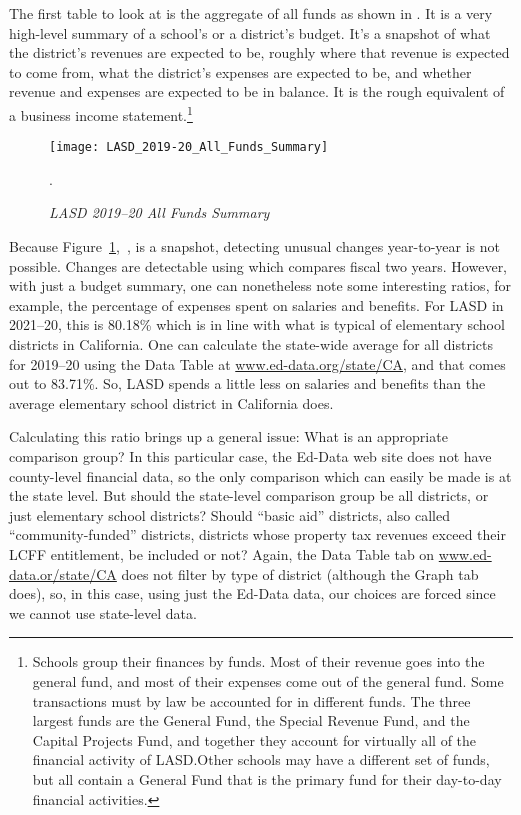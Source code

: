 The first table to look at is the aggregate of all funds as shown in . It is a very high-level summary of a school's or a district's budget. It's a snapshot of what the district's revenues are expected to be, roughly where that revenue is expected to come from, what the district's expenses are expected to be, and whether revenue and expenses are expected to be in balance. It is the rough equivalent of a business income statement.\footnote{Schools group their finances by funds. Most of their revenue goes into the general fund, and most of their expenses come out of the general fund. Some transactions must by law be accounted for in different funds. The three largest funds are the General Fund, the Special Revenue Fund, and the Capital Projects Fund, and together they account for virtually all of the financial activity of LASD.\@ Other schools may have a different set of funds, but all contain a General Fund that is the primary fund for their day-to-day financial activities.}

\begin{figure}
  \centering
  \caption[LASD 2019–20 All Funds Summary]{\textit{LASD 2019–20 All Funds Summary}}\label{fig:LASD_All_Funds_Summary}
  \texttt{[image: LASD\_2019-20\_All\_Funds\_Summary]}\\ %
  \footnotesize\raggedright\textcite[38]{Kenyon2019}.
\end{figure}

Because Figure~\ref{fig:LASD_All_Funds_Summary},~, is a snapshot, detecting unusual changes year-to-year is not possible. Changes are detectable using   which compares fiscal two years. However, with just a budget summary, one can nonetheless note some interesting ratios, for example, the percentage of expenses spent on salaries and benefits. For LASD in 2021–20, this is 80.18\% which is in line with what is typical of elementary school districts in California. One can calculate the state-wide average for all districts for 2019–20 using the Data Table at \url{www.ed-data.org/state/CA}, and that comes out to 83.71\%. So, LASD spends a little less on salaries and benefits than the average elementary school district in California does.

Calculating this ratio brings up a general issue: What is an appropriate comparison group? In this particular case, the Ed-Data web site does not have county-level financial data, so the only comparison which can easily be made is at the state level. But should the state-level comparison group be all districts, or just elementary school districts? Should ``basic aid'' districts, also called ``community-funded'' districts, districts whose property tax revenues exceed their LCFF entitlement, be included or not? Again, the Data Table tab on \url{www.ed-data.or/state/CA} does not filter by type of district (although the Graph tab does), so, in this case, using just the Ed-Data data, our choices are forced since we cannot use state-level data.

